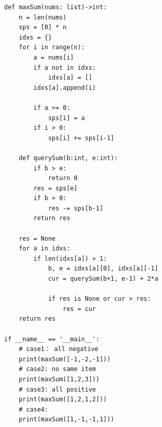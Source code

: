 \documentclass{article}
\begin{document}
\begin{lstlisting}
def maxSum(nums: list)->int:
    n = len(nums)
    sps = [0] * n
    idxs = {}
    for i in range(n):
        a = nums[i]
        if a not in idxs:
            idxs[a] = []
        idxs[a].append(i)

        if a >= 0:
            sps[i] = a
        if i > 0:
            sps[i] += sps[i-1]

    def querySum(b:int, e:int):
        if b > e:
            return 0
        res = sps[e]
        if b > 0:
            res -= sps[b-1]
        return res

    res = None
    for a in idxs:
        if len(idxs[a]) > 1:
            b, e = idxs[a][0], idxs[a][-1]
            cur = querySum(b+1, e-1) + 2*a

            if res is None or cur > res:
                res = cur
    return res

if __name__ == '__main__':
    # case1： all negative
    print(maxSum([-1,-2,-1]))
    # case2: no same item
    print(maxSum([1,2,3]))
    # case3: all positive
    print(maxSum([1,2,1,2]))
    # case4: 
    print(maxSum([1,-1,-1,1]))

\end{lstlisting}
\end{document}
